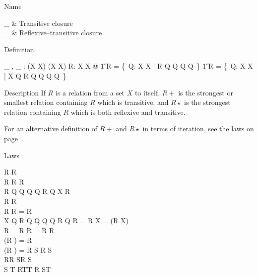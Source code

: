 \begin{manpage}\label{p:1080}
\item[Name]
\begin{name}
        \_ \plus & Transitive closure%
		 \\
        \_ \star & Reflexive--transitive closure%
\end{name}

\item[Definition]
\begin{gendef}[X]
        \_ \plus, \_ \star: (X \rel X) \fun (X \rel X)
\where
        \forall R: X \rel X @
\also
\t1        R \plus = \bigcap \{~Q: X \rel X |
		R \subseteq Q \land Q \comp Q \subseteq Q~\} \land
\also
\t1        R \star = \bigcap \{~Q: X \rel X |
		\id X \subseteq Q \land R \subseteq Q \land 
						Q \comp Q \subseteq Q~\}
\end{gendef}

\item[Description]
If $R$ is a relation from a set $X$ to itself, $R \plus$ is the strongest
or smallest relation containing $R$ which is transitive, and $R \star$ is the
strongest relation containing $R$ which is both reflexive and
transitive.

For an alternative definition of $R \plus$ and $R \star$ in terms of
iteration, see the laws on page~\pageref{p:iter}.

\item[Laws]
\begin{laws}
     R \subseteq R \plus \\
     R \plus \comp R \plus \subseteq R \plus \\
     R \subseteq Q \land Q \comp Q \subseteq Q \implies R \plus \subseteq Q
\also
     \id X \subseteq R \star \\
     R \subseteq R \star \\
     R \star \comp R \star = R \star \\
     \id X \subseteq Q \land R \subseteq Q \land Q \comp Q \subseteq Q %
                                                \implies R \star \subseteq Q
\also
     R \star = R \plus \cup \id X = (R \cup \id X) \plus \\
     R \plus = R \comp R \star = R \star \comp R \\
     (R \plus) \plus = R \plus \\
     (R \star) \star = R \star
\also
     S \subseteq R \star\limg S\rimg \\
     R\limg R \star\limg S\rimg\rimg \subseteq R \star\limg S\rimg \\
     S \subseteq T \land R\limg T\rimg \subseteq T \implies
		R \star\limg S\rimg \subseteq T
\end{laws}
\end{manpage}
